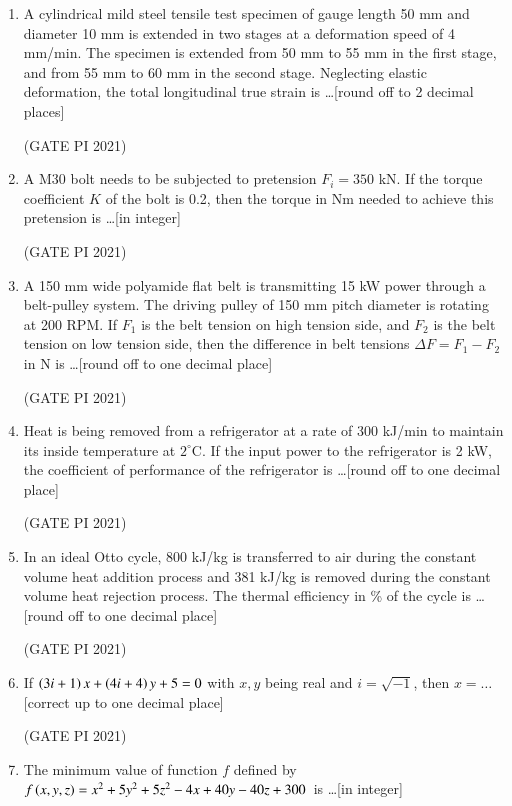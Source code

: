 \documentclass[journal,12pt,onecolumn]{IEEEtran}
\theoremstyle{remark}
\begin{document}
\begin{enumerate}
\item
A cylindrical mild steel tensile test specimen of gauge length 50 mm and diameter 10 mm is extended in two stages at a deformation speed of 4 mm/min. The specimen is extended from 50 mm to 55 mm in the first stage, and from 55 mm to 60 mm in the second stage. Neglecting elastic deformation, the total longitudinal true strain is \ldots [round off to 2 decimal places]

\hfill (GATE PI 2021)

\item
A M30 bolt needs to be subjected to pretension $F_i = 350$ kN. If the torque coefficient $K$ of the bolt is 0.2, then the torque in Nm needed to achieve this pretension is \ldots [in integer]

\hfill (GATE PI 2021)

\item
A 150 mm wide polyamide flat belt is transmitting 15 kW power through a belt-pulley system. The driving pulley of 150 mm pitch diameter is rotating at 200 RPM. If $F_1$ is the belt tension on high tension side, and $F_2$ is the belt tension on low tension side, then the difference in belt tensions $\Delta F = F_1 - F_2$ in N is \ldots [round off to one decimal place]

\hfill (GATE PI 2021)

\item
Heat is being removed from a refrigerator at a rate of 300 kJ/min to maintain its inside temperature at $2^\circ$C. If the input power to the refrigerator is 2 kW, the coefficient of performance of the refrigerator is \ldots [round off to one decimal place]

\hfill (GATE PI 2021)

\item
In an ideal Otto cycle, 800 kJ/kg is transferred to air during the constant volume heat addition process and 381 kJ/kg is removed during the constant volume heat rejection process. The thermal efficiency in \% of the cycle is \ldots [round off to one decimal place]

\hfill (GATE PI 2021)

\item
If $\left(3i + 1\right)x + \left(4i + 4\right)y + 5 = 0$ with $x, y$ being real and $i = \sqrt{-1}$, then $x = \ldots$ [correct up to one decimal place]

\hfill (GATE PI 2021)

\item
The minimum value of function $f$ defined by\
$f\left(x, y, z\right) = x^2 + 5y^2 + 5z^2 - 4x + 40y - 40z + 300$\
is \ldots [in integer]


\end{enumerate}
\end{document}
